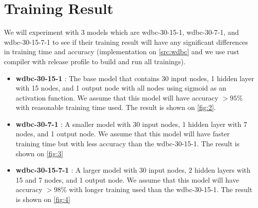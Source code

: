 \documentclass{article}
\begin{document}
\section*{Training Result}\label{trainres}
We will experiment with 3 models which are wdbc-30-15-1, wdbc-30-7-1, and wdbc-30-15-7-1 to see if their training result will have 
any significant differences in training time and accuracy (implementation on \ref{src:wdbc} 
and we use rust compiler with release profile to build and run all trainings). 

\begin{itemize}
    \item {\textbf{wdbc-30-15-1} : The base model that contains 30 input nodes, 1 hidden layer with 15 nodes, 
        and 1 output node with all nodes using sigmoid as an activation function. 
        We assume that this model will have accuracy $ > 95\%$ with reasonable training time used.
        The result is shown on \cref{fig:2}.
    }
    \item{\textbf{wdbc-30-7-1} : A smaller model with 30 input nodes, 1 hidden layer with 7 nodes, and 1 output node. 
        We assume that this model will have faster training time but with less accuracy than the wdbc-30-15-1. The result is shown on \cref{fig:3}
    }
    \item{\textbf{wdbc-30-15-7-1} : A larger model with 30 input nodes, 2 hidden layers with 15 and 7 nodes, and 1 output node.
        We assume that this model will have accuracy $ > 98\%$ with longer training used than the wdbc-30-15-1. The result is shown on \cref{fig:4}
    }
\end{itemize}
\end{document}
